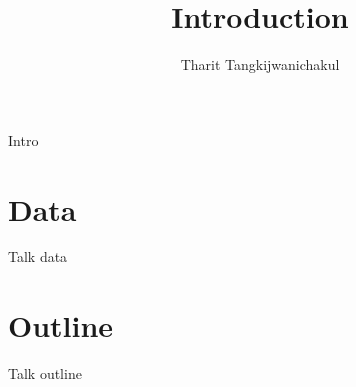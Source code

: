 \title{Introduction}
\author{Tharit Tangkijwanichakul}
\label{ch:chapter-intro}

\maketitle

Intro

\section{Data}
Talk data

\section{Outline}

Talk outline
